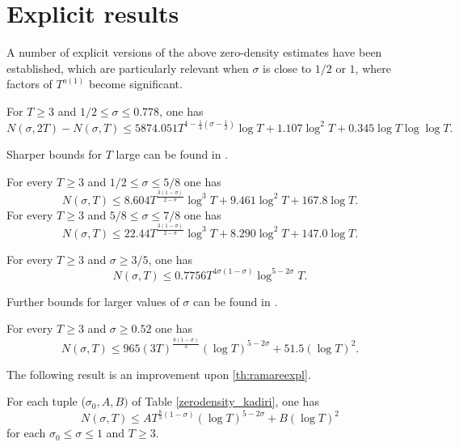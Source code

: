 \section{Explicit results}
A number of explicit versions of the above zero-density estimates have been established, which are particularly relevant when $\sigma$ is close to $1/2$ or $1$, where factors of $T^{o(1)}$ become significant. 

\begin{theorem}
For $T \ge 3$ and $1/2 \le \sigma \le 0.778$, one has
$$
N(\sigma, 2 T)-N(\sigma, T) \leq  5874.051 T^{1-\frac{1}{4}\left(\sigma-\frac{1}{2}\right)} \log T+ 1.107 \log ^2 T + 0.345\log T \log \log T.
$$
\end{theorem}
Sharper bounds for $T$ large can be found in \cite{simonic}.

\begin{theorem}For every $T\ge 3 $ and $1/2\le \sigma\le 5/8$ one has
\[
N(\sigma, T) \leq 8.604 T^{\frac{3(1-\sigma)}{2-\sigma}} \log ^3 T+9.461 \log ^2 T+167.8 \log T.
\]
For every $T\ge 3 $ and $5/8\le \sigma\le 7/8$ one has
    \[
    N(\sigma, T) \leq 22.44 T^{\frac{3(1-\sigma)}{2-\sigma}} \log ^3 T+8.290 \log ^2 T+147.0 \log T.
    \]
\end{theorem}

\begin{theorem}For every $T\ge 3$ and $\sigma\ge 3/5$, one has
    \begin{equation*}
N(\sigma, T) \leq 0.7756 T^{4 \sigma(1-\sigma)} \log ^{5-2 \sigma} T.
\end{equation*}
\end{theorem}
Further bounds for larger values of $\sigma$ can be found in \cite{chourasiya_explicit_2024}.

\begin{theorem}\label{th:ramareexpl} For every $T\ge 3$ and $\sigma\ge 0.52$ one has
    \begin{equation*}
N(\sigma, T) \leq 965(3 T)^{\frac{8(1-\sigma)}{3}}(\log T)^{5-2 \sigma}+51.5(\log T)^2.
\end{equation*}
\end{theorem}

The following result is an improvement upon \cref{th:ramareexpl}.
\begin{theorem}\label{th:explicitkln}
For each tuple ($\sigma_0, A, B)$ of Table \ref{zerodensity_kadiri}, one has
\[
N(\sigma, T) \leq AT^{\frac{8}{3}(1-\sigma)}(\log T)^{5-2\sigma} + B(\log T)^2
\]
for each $\sigma_0 \le \sigma \le 1$ and $T \ge 3$.
\end{theorem}


